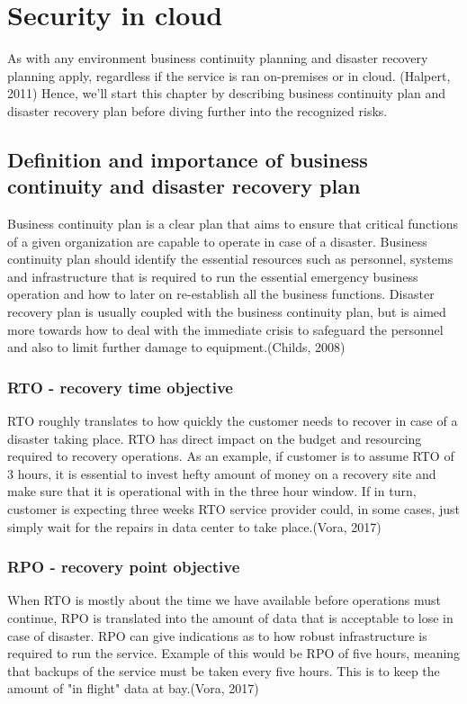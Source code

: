 \documentclass{article}
\begin{document}
\section{Security in cloud}
As with any environment business continuity planning and disaster recovery planning apply, regardless if the service is ran on-premises or in cloud. (Halpert, 2011)
Hence, we'll start this chapter by describing business continuity plan and disaster recovery plan before diving further into the recognized risks.
\subsection{Definition and importance of business continuity and disaster recovery plan}
Business continuity plan is a clear plan that aims to ensure that critical functions of a given organization are capable to operate in case of a disaster.
Business continuity plan should identify the essential resources such as personnel, systems and infrastructure that is required to run the essential emergency business operation and how to later on re-establish all the business functions.
Disaster recovery plan is usually coupled with the business continuity plan, but is aimed more towards how to deal with the immediate crisis to safeguard the personnel and also to limit further damage to equipment.(Childs, 2008)
\subsubsection{RTO - recovery time objective}
RTO roughly translates to how quickly the customer needs to recover in case of a disaster taking place. RTO has direct impact on the budget and resourcing required to recovery operations. As an example, if customer is to assume RTO of 3 hours, it is essential to invest hefty amount of money on a recovery site and make sure that it is operational with in the three hour window. If in turn, customer is expecting three weeks RTO service provider could, in some cases, just simply wait for the repairs in data center to take place.(Vora, 2017)
\subsubsection{RPO - recovery point objective}
When RTO is mostly about the time we have available before operations must continue, RPO is translated into the amount of data that is acceptable to lose in case of disaster. RPO can give indications as to how robust infrastructure is required to run the service. Example of this would be RPO of five hours, meaning that backups of the service must be taken every five hours. This is to keep the amount of "in flight" data at bay.(Vora, 2017)
\end{document}
